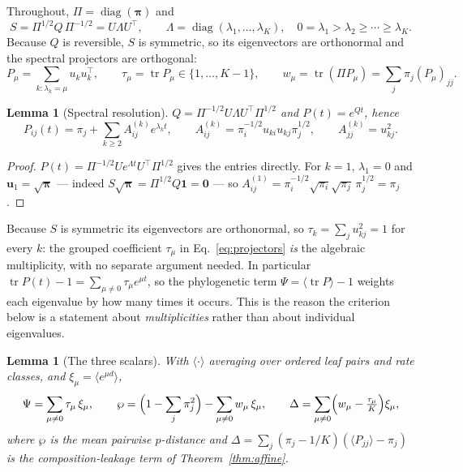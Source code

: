 \documentclass[preprint,12pt,authoryear]{elsarticle}
\newcommand{\bpi}{\boldsymbol{\pi}}
\newcommand{\tr}{\operatorname{tr}}
\newtheorem{lemma}[theorem]{Lemma}
\theoremstyle{definition}
\theoremstyle{remark}
\begin{document}
Throughout, $\Pi=\operatorname{diag}(\bpi)$ and
\begin{equation}
  S=\Pi^{1/2}Q\,\Pi^{-1/2}=U\Lambda U^{\!\top},\qquad
  \Lambda=\operatorname{diag}(\lambda_1,\dots,\lambda_K),\quad
  0=\lambda_1>\lambda_2\ge\cdots\ge\lambda_K .
\end{equation}
Because $Q$ is reversible, $S$ is symmetric, so its eigenvectors are
orthonormal and the spectral projectors are orthogonal:
\begin{equation}
  P_\mu=\sum_{k:\lambda_k=\mu}u_ku_k^{\!\top},\qquad
  \tau_\mu=\tr P_\mu\in\{1,\dots,K-1\},\qquad
  w_\mu=\tr(\Pi P_\mu)=\sum_j\pi_j(P_\mu)_{jj}.
  \label{eq:projectors}
\end{equation}
\begin{lemma}[Spectral resolution]
\label{lem:spectral}
$Q=\Pi^{-1/2}U\Lambda U^{\!\top}\Pi^{1/2}$ and $P(t)=e^{Qt}$, hence
\begin{equation}
  P_{ij}(t)=\pi_j+\sum_{k\ge2}A^{(k)}_{ij}e^{\lambda_kt},\qquad
  A^{(k)}_{ij}=\pi_i^{-1/2}u_{ki}u_{kj}\pi_j^{1/2},\qquad
  A^{(k)}_{jj}=u_{kj}^2 .
\end{equation}
\end{lemma}

\begin{proof}
$P(t)=\Pi^{-1/2}Ue^{\Lambda t}U^{\!\top}\Pi^{1/2}$ gives the entries directly.
For $k=1$, $\lambda_1=0$ and $\mathbf u_1=\sqrt{\bpi}$ --- indeed
$S\sqrt{\bpi}=\Pi^{1/2}Q\mathbf 1=\mathbf 0$ --- so
$A^{(1)}_{ij}=\pi_i^{-1/2}\sqrt{\pi_i}\sqrt{\pi_j}\,\pi_j^{1/2}=\pi_j$.
\end{proof}

Because $S$ is symmetric its eigenvectors are orthonormal, so
$\tau_k=\sum_ju_{kj}^2=1$ for every $k$: the grouped coefficient
$\tau_\mu$ in Eq.~\eqref{eq:projectors} \emph{is} the algebraic multiplicity,
with no separate argument needed. In particular
$\tr P(t)-1=\sum_{\mu\ne0}\tau_\mu e^{\mu t}$, so the phylogenetic term
$\Psi=\langle\tr P\rangle-1$ weights each eigenvalue by how many times it
occurs. This is the reason the criterion below is a statement about
\emph{multiplicities} rather than about individual eigenvalues.

\begin{lemma}[The three scalars]
\label{lem:scalars}
With $\langle\cdot\rangle$ averaging over ordered leaf pairs and rate classes,
and $\xi_\mu=\langle e^{\mu d}\rangle$,
\begin{equation}
  \Psi=\sum_{\mu\ne0}\tau_\mu\,\xi_\mu,\qquad
  \wp=\Bigl(1-\sum_j\pi_j^2\Bigr)-\sum_{\mu\ne0}w_\mu\,\xi_\mu,\qquad
  \Delta=\sum_{\mu\ne0}\Bigl(w_\mu-\tfrac{\tau_\mu}{K}\Bigr)\xi_\mu ,
  \label{eq:scalars}
\end{equation}
where $\wp$ is the mean pairwise $p$-distance and
$\Delta=\sum_j(\pi_j-1/K)(\langle P_{jj}\rangle-\pi_j)$ is the
composition-leakage term of Theorem~\ref{thm:affine}.
\end{lemma}
\end{document}
